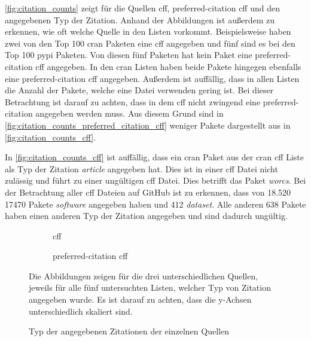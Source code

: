 \autoref{fig:citation_counts} zeigt für die Quellen \gls{cff}, \glqq preferred-citation\grqq{} \gls{cff} und  den angegebenen Typ der Zitation.
Anhand der Abbildungen ist außerdem zu erkennen, wie oft welche Quelle in den Listen vorkommt.
Beispielsweise haben zwei von den Top 100 \gls{cran} Paketen eine \gls{cff} angegeben und fünf sind es bei den Top 100 \gls{pypi} Paketen.
Von diesen fünf Paketen hat kein Paket eine \glqq preferred-citation\grqq{} \gls{cff} angegeben.
In den \gls{cran} Listen haben beide Pakete hingegen ebenfalls eine \glqq preferred-citation\grqq{} \gls{cff} angegeben.
Außerdem ist auffällig, dass in allen Listen die Anzahl der Pakete, welche eine  Datei verwenden gering ist.
Bei dieser Betrachtung ist darauf zu achten, dass in dem \gls{cff} nicht zwingend eine \glqq preferred-citation\grqq{} angegeben werden muss.
Aus diesem Grund sind in \autoref{fig:citation_counts_preferred_citation_cff} weniger Pakete dargestellt aus in \autoref{fig:citation_counts_cff}.

In \autoref{fig:citation_counts_cff} ist auffällig, dass ein \gls{cran} Paket aus der \gls{cran} \gls{cff} Liste als Typ der Zitation \emph{article} angegeben hat.
Dies ist in einer \gls{cff} Datei nicht zulässig und führt zu einer ungültigen \gls{cff} Datei.
Dies betrifft das Paket \emph{worcs}.
Bei der Betrachtung aller \gls{cff} Dateien auf GitHub ist zu erkennen, dass von 18.520 17470 Pakete \emph{software} angegeben haben und 412 \emph{dataset}.
Alle anderen 638 Pakete haben einen anderen Typ der Zitation angegeben und sind dadurch ungültig.

\begin{figure}
    \begin{subfigure}{.5\textwidth}
        \centering
        
        \caption{\gls{cff}}
        \label{fig:citation_counts_cff}
    \end{subfigure}%
    \begin{subfigure}{.5\textwidth}
        \centering
        
        \caption{\glqq preferred-citation\grqq{} \gls{cff}}
        \label{fig:citation_counts_preferred_citation_cff}
    \end{subfigure}
    \centering
    \begin{subfigure}{.5\textwidth}
        \centering
        
        \caption{}
        \label{fig:citation_counts_bib}
    \end{subfigure}
    \caption{Typ der angegebenen Zitationen der einzelnen Quellen}
    \label{fig:citation_counts}
    \small
    \raggedright
    Die Abbildungen zeigen für die drei unterschiedlichen Quellen, jeweils für alle fünf untersuchten Listen, welcher Typ von Zitation angegeben wurde. Es ist darauf zu achten, dass die y-Achsen unterschiedlich skaliert sind.
\end{figure}


